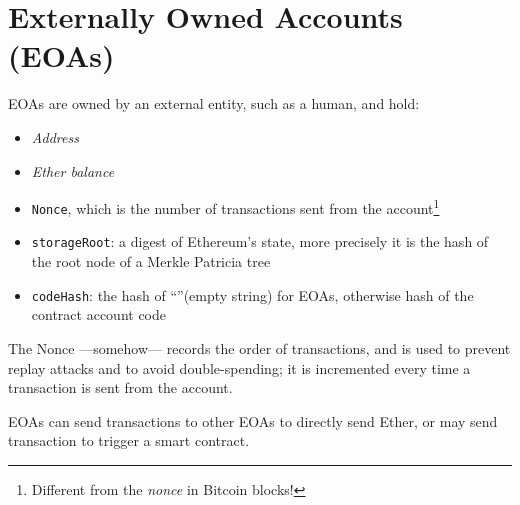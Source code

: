 \section{Externally Owned Accounts (EOAs)}
{EOAs are owned by an external entity, such as a human, and hold:\ns
\begin{itemize}
   \item \textit{Address}
   \item \textit{Ether balance}
   \item \texttt{Nonce}, which is the number of transactions sent from the account\footnote{Different from the \textit{nonce} in Bitcoin blocks!}
   \item \texttt{storageRoot}: a digest of Ethereum's state, more precisely it is the hash of the root node of a Merkle Patricia tree
   \item \texttt{codeHash}: the hash of ``''(empty string) for EOAs, otherwise hash of the contract account code
\end{itemize}}
The Nonce ---somehow--- records the order of transactions, and is used to prevent replay attacks and to avoid double-spending; it is incremented every time a transaction is sent from the account.


EOAs can send transactions to other EOAs to directly send Ether, or may send transaction to trigger a smart contract.

